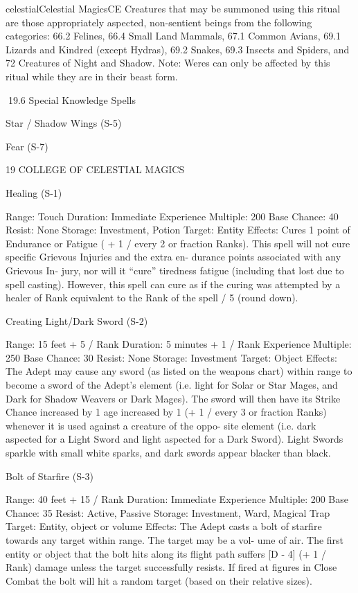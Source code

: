 \begin{College}[1.3]{celestial}{Celestial Magics}{CE}
Creatures  that  may  be  summoned  using  this  ritual 
are 
those  appropriately  aspected,  non-sentient 
beings from the following categories: 66.2 Felines, 
66.4 Small Land Mammals, 67.1 Common Avians, 
69.1  Lizards  and  Kindred  (except  Hydras),  69.2 
Snakes, 69.3 Insects and Spiders, and 72 Creatures 
of  Night  and  Shadow.  Note:  Weres  can  only  be 
affected  by  this  ritual  while  they  are  in their  beast 
form. 

19.6 Special Knowledge Spells 

Star / Shadow Wings (S-5) 

Fear (S-7) 

19 COLLEGE OF CELESTIAL MAGICS 

Healing (S-1) 

Range: Touch 
Duration: Immediate 
Experience Multiple: 200 
Base Chance: 40%
Resist: None 
Storage: Investment, Potion 
Target: Entity 
Effects: Cures 1 point of Endurance or Fatigue ( + 
1  /  every  2  or  fraction  Ranks).  This  spell  will  not 
cure  specific  Grievous  Injuries  and  the  extra  en-
durance  points  associated  with  any  Grievous  In-
jury, nor will it “cure” tiredness fatigue (including 
that  lost  due  to  spell  casting).  However,  this  spell 
can cure as if the curing was attempted by a healer 
of  Rank  equivalent  to  the  Rank  of  the  spell  /  5 
(round down). 

Creating Light/Dark Sword (S-2) 

Range: 15 feet + 5 / Rank 
Duration: 5 minutes + 1 / Rank 
Experience Multiple: 250 
Base Chance: 30%
Resist: None 
Storage: Investment 
Target: Object 
Effects: The Adept may cause any sword (as listed 
on  the  weapons  chart)  within  range  to  become  a 
sword of the Adept’s element (i.e. light for Solar or 
Star  Mages,  and  Dark  for  Shadow  Weavers  or 
Dark  Mages).  The  sword  will  then  have  its  Strike 
Chance increased by 1%
age increased by 1 (+ 1 / every 3 or fraction Ranks) 
whenever it is used against a creature of the oppo-
site  element  (i.e.  dark  aspected  for  a  Light  Sword 
and  light  aspected  for  a  Dark  Sword).  Light 
Swords  sparkle  with  small  white  sparks,  and  dark 
swords appear blacker than black. 

Bolt of Starfire (S-3) 

Range: 40 feet + 15 / Rank 
Duration: Immediate 
Experience Multiple: 200 
Base Chance: 35%
Resist: Active, Passive 
Storage: Investment, Ward, Magical Trap 
Target: Entity, object or volume 
Effects:  The  Adept  casts  a  bolt  of  starfire  towards 
any  target  within  range.  The  target  may  be  a  vol-
ume  of  air.  The  first  entity  or  object  that  the  bolt 
hits along its flight path suffers [D - 4] (+ 1 / Rank) 
damage  unless  the  target  successfully  resists.  If 
fired at figures in Close Combat the bolt will hit a 
random target (based on their relative sizes). 


\end{College}
